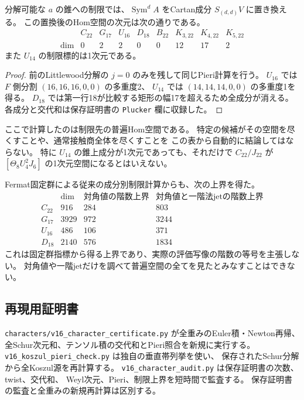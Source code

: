 \begin{proposition}[Pl\"ucker錐への制限の標的次元]
\label{prop:v16-plucker-dimensions}
分解可能な $a$ の錐への制限では、$\operatorname{Sym}^dA$ をCartan成分
$S_{(d,d)}V$ に置き換える。
この置換後のHom空間の次元は次の通りである。
\[
\begin{array}{c|rrrrrrrr}
 &C_{22}&G_{17}&U_{16}&D_{18}&B_{22}&K_{3,22}&K_{4,22}&K_{5,22}\\\hline
 \dim&0&2&2&0&0&12&17&2
\end{array}
\]
また $U_{14}$ の制限標的は1次元である。
\end{proposition}

\begin{proof}
前のLittlewood分解の $j=0$ のみを残して同じPieri計算を行う。
$U_{16}$ では $F$ 側分割 $(16,16,16,0,0)$ の多重度2、
$U_{14}$ では $(14,14,14,0,0)$ の多重度1を得る。
$D_{18}$ では第一行18が比較する矩形の幅17を超えるため全成分が消える。
各成分と交代和は保存証明書の \texttt{Plucker} 欄に収録した。
\end{proof}

ここで計算したのは制限先の普遍Hom空間である。
特定の候補がその空間を尽くすことや、通常接触商全体を尽くすことを
この表から自動的に結論してはならない。
特に $U_{14}$ の錐上成分が1次元であっても、それだけで
$C_{22}/J_{22}$ が $[\Theta_8U_4^2J_6]$ の1次元空間になるとはいえない。

Fermat固定群による従来の成分別制限計算からも、次の上界を得た。
\[
\begin{array}{c|r|r|r}
 &\dim&\text{対角値の階数上界}&\text{対角値と一階法jetの階数上界}\\\hline
C_{22}&916&284&803\\
G_{17}&3929&972&3244\\
U_{16}&486&106&371\\
D_{18}&2140&576&1834
\end{array}
\]
これは固定群指標から得る上界であり、実際の評価写像の階数の等号を主張しない。
対角値や一階jetだけを調べて普遍空間の全てを見たとみなすことはできない。

\subsection{再現用証明書}

\texttt{characters/v16\_character\_certificate.py} が全重みのEuler積・Newton再帰、
全Schur次元和、テンソル積の交代和とPieri照合を新規に実行する。
\texttt{v16\_koszul\_pieri\_check.py} は独自の垂直帯列挙を使い、
保存されたSchur分解から全Koszul源を再計算する。
\texttt{v16\_character\_audit.py} は保存証明書の次数、twist、交代和、
Weyl次元、Pieri、制限上界を短時間で監査する。
保存証明書の監査と全重みの新規再計算は区別する。

